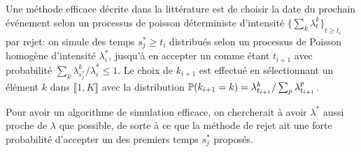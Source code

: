 \documentclass[../main.tex]{subfiles}
\begin{document}
Une méthode efficace décrite dans la littérature est de choisir la date du prochain événement selon un processus de poisson déterministe d'intensité ${\{\sum_k\lambda^k_t\}}_{t\geq t_i}$ par rejet: on simule des temps $s_j^*\geq t_i$ distribués selon un processus de Poisson homogène d'intensité $\lambda_i^*$, jusqu'à en accepter un comme étant $t_{i+1}$ avec probabilité $\sum_k\lambda^k_{s_j^*}/\lambda^*_{i} \leq 1$. Le choix de $k_{i+1}$ est effectué en sélectionnant un élément $k$ dans $\llbracket 1,K\rrbracket$ avec la distribution $\mathbb{P}(k_{i+1} = k) = \lambda^{k}_{t_{i+1}}/\sum_p \lambda^p_{t_{i+1}}$. \cite{meiEisnerNeuralHawkes,ogata1981}

Pour avoir un algorithme de simulation efficace, on chercherait à avoir $\lambda^*$ aussi proche de $\lambda$ que possible, de sorte à ce que la méthode de rejet ait une forte probabilité d'accepter un des premiers temps $s_j^*$ proposés.\footnotemark

\end{document}
